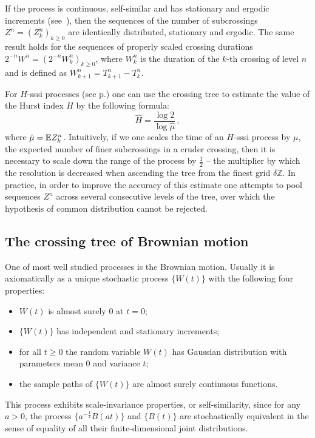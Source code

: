 If the process is continuous, self-similar and has stationary and ergodic increments
(see~\cite{jonesshen2005}), then the sequences of the number of subcrossings $Z^n = (Z_k^n)_{k\geq 0}$
are identically distributed, stationary and ergodic. The same result holds for
the sequences of properly scaled crossing durations $2^{-n} W^n = (2^{-n} W_k^n)_{k\geq0}$,
where $W_k^n$ is the duration of the $k$-th crossing of level $n$ and is defined
as $W_{k+1}^n = T_{k+1}^n - T_k^n$.

For $H$-sssi processes (see p.\pageref{def:hsssi}) one can use the crossing tree
to estimate the value of the Hurst index $H$ by the following formula:
\[ \hat{H} = \frac{\log 2}{\log \hat{\mu}} \,,\]
where $\hat{\mu} = \mathbb{E} Z_k^n$. Intuitively, if we one scales the time of an $H$-sssi
process by $\mu$, the expected number of finer subcrossings in a cruder crossing,
then it is necessary to scale down the range of the process by $\tfrac{1}{2}$ --
the multiplier by which the resolution is decreased when ascending the tree from
the finest grid $\delta \mathbb{Z}$. In practice, in order to improve the accuracy of
this estimate one attempts to pool sequences $Z^n$ across several consecutive levels
of the tree, over which the hypothesis of common distribution cannot be rejected.


\subsection{The crossing tree of Brownian motion} %
\label{sub:the_crossing_tree_of_brownian_motion}

One of most well studied processes is the Brownian motion. Usually it is axiomatically
as a unique stochastic process $\bigl\{W(t)\bigr\}$ with the following four properties:
\begin{itemize}
    \item $W(t)$ is almost surely $0$ at $t=0$;
    \item $\{W(t)\}$ has independent and stationary increments;
    \item for all $t\geq 0$ the random variable $W(t)$ has Gaussian distribution with
    parameters mean $0$ and variance $t$;
    \item the sample paths of $\{W(t)\}$ are almost surely continuous functions.
\end{itemize}
This process exhibits scale-invariance properties, or self-similarity, since for any
$a>0$, the process $\bigl\{a^{-\tfrac{1}{2}} B(at)\bigr\}$ and $\{B(t)\}$ are stochastically
equivalent in the sense of equality of all their finite-dimensional joint distributions.

